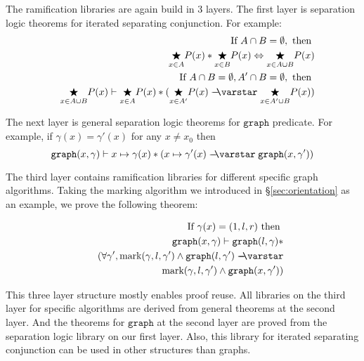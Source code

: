 The ramification libraries are again build in 3 layers. The first layer is separation logic theorems for iterated separating conjunction. For example:
\begin{eqnarray*}
&& \text{If }A \cap B = \emptyset, \text{ then } \\
&&  \underset{x\in A}{\bigstar} P(x) *   \underset{x\in B}{\bigstar} P(x) \Leftrightarrow \underset{x\in A \cup B}{\bigstar} P(x) \\
&& \text{If }A \cap B = \emptyset,  A' \cap B = \emptyset, \text{ then }\\
&& \underset{x\in A\cup B}{\bigstar} P(x) \vdash \underset{x\in A}{\bigstar} P(x) * ( \underset{x\in A'}{\bigstar} P(x) \wand \underset{x\in A' \cup B}{\bigstar} P(x))
\end{eqnarray*}

The next layer is general separation logic theorems for $\mathtt{graph}$ predicate. For example, if $\gamma(x) = \gamma'(x)$ for any $x \neq x_0$ then
$$\mathtt{graph}(x, \gamma) \vdash x \mapsto \gamma(x) * (x \mapsto \gamma'(x) \wand \mathtt{graph}(x, \gamma'))$$

The third layer contains ramification libraries for different specific graph algorithms. Taking the marking algorithm we introduced in \S\ref{sec:orientation} as an example, we prove the following theorem:

\begin{eqnarray*}
&& \text{If } \gamma(x) = (1, l, r) \text{ then } \\
&& \mathtt{graph}(x, \gamma) \vdash \mathtt{graph}(l, \gamma) * \\
&& ~~ (\forall \gamma', \text{mark}(\gamma, l, \gamma') \wedge \mathtt{graph}(l, \gamma') \wand \\
&& ~~~~~~~~~~~~~~~~ \text{mark}(\gamma, l, \gamma') \wedge \mathtt{graph}(x, \gamma'))
\end{eqnarray*}

This three layer structure mostly enables proof reuse. All libraries on the third layer for specific algorithms are derived from general theorems at the second layer. And the theorems for $\mathtt{graph}$ at the second layer are proved from the separation logic library on our first layer. Also, this library for iterated separating conjunction can be used in other structures than graphs.

